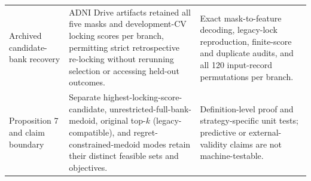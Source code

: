 \begin{table}[H]
\begin{tabularx}{\textwidth}{@{}>{\raggedright\arraybackslash}p{}>{\raggedright\arraybackslash}X>{\raggedright\arraybackslash}X@{}}
Archived candidate-bank recovery & ADNI Drive artifacts retained all five masks and development-CV locking scores per branch, permitting strict retrospective re-locking without rerunning selection or accessing held-out outcomes. & Exact mask-to-feature decoding, legacy-lock reproduction, finite-score and duplicate audits, and all 120 input-record permutations per branch. \\
Proposition 7 and claim boundary & Separate highest-locking-score-candidate, unrestricted-full-bank-medoid, original top-$k$ (legacy-compatible), and regret-constrained-medoid modes retain their distinct feasible sets and objectives. & Definition-level proof and strategy-specific unit tests; predictive or external-validity claims are not machine-testable. \\
\bottomrule
\end{tabularx}
\end{table}

